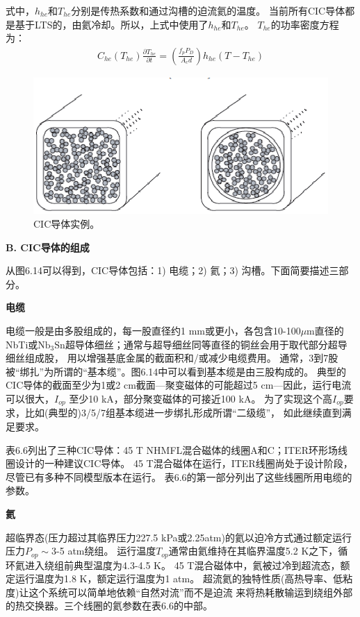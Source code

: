 式中，$h_{he}$和$T_{he}$分别是传热系数和通过沟槽的迫流氦的温度。
当前所有CIC导体都是基于LTS的，由氦冷却。所以，上式中使用了$h_{he}$和$T_{he}$。
$T_{he}$的功率密度方程为：
\begin{align*}%
C_{he}(T_{he})\frac{\partial T_{he}}{\partial t}=(\frac{f_{p}P_D}{A_cd})h_{he}(T-T_{he})
\end{align*}

\begin{figure}[htbp]
	\centering
	\includegraphics[scale=0.7]{chpt6/figs/fig6.14.eps}
	\caption{CIC导体实例。}
\end{figure}

\textbf{B. CIC导体的组成}

从图6.14可以得到，CIC导体包括：1) 电缆；2) 氦；3) 沟槽。下面简要描述三部分。

\textbf{电缆}

电缆一般是由多股组成的，每一股直径约1 mm或更小，各包含10-100$\mu$m直径的
NbTi或$\mathrm{Nb_3Sn}$超导体细丝；通常与超导细丝同等直径的铜丝会用于取代部分超导细丝组成股，
用以增强基底金属的截面积和/或减少电缆费用。
通常，3到7股被“绑扎”为所谓的“基本缆”。图6.14中可以看到基本缆是由三股构成的。
典型的CIC导体的截面至少为1或2 cm截面---聚变磁体的可能超过5 cm---因此，运行电流可以很大，$I_{op}$
至少10 kA，部分聚变磁体的可接近100 kA。
为了实现这个高$I_{op}$要求，比如(典型的)3/5/7组基本缆进一步绑扎形成所谓“二级缆”，
如此继续直到满足要求。

表6.6列出了三种CIC导体：45 T NHMFL混合磁体的线圈A和C；ITER环形场线圈设计的一种建议CIC导体。
45 T混合磁体在运行，ITER线圈尚处于设计阶段，尽管已有多种不同模型版本在运行。
表6.6的第一部分列出了这些线圈所用电缆的参数。

\textbf{氦}

超临界态(压力超过其临界压力227.5 kPa或2.25atm)的氦以迫冷方式通过额定运行压力$P_{op}\sim$3-5 atm绕组。
运行温度$T_{op}$通常由氦维持在其临界温度5.2 K之下，循环氦进入绕组前典型温度为4.3-4.5 K。
45 T混合磁体中，氦被过冷到超流态，额定运行温度为1.8 K，额定运行温度为1 atm。
超流氦的独特性质(高热导率、低粘度)让这个系统可以简单地依赖“自然对流”而不是迫流
来将热耗散输运到绕组外部的热交换器。三个线圈的氦参数在表6.6的中部。

